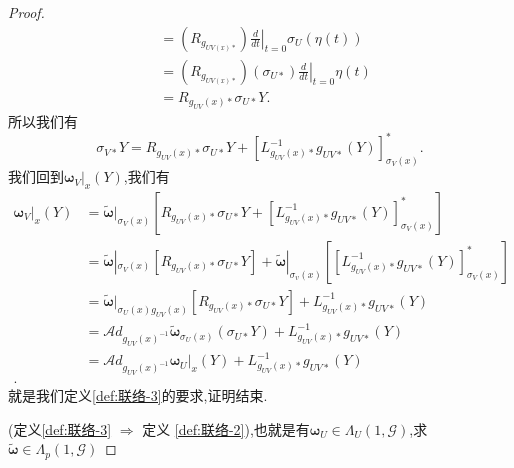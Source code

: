 \documentclass[../main.tex]{subfiles}
\begin{document}
\begin{proof}
\begin{align*}
                                                                & = (R_{g_{UV(x)*}})\left.\frac{d}{dt} \right|_{t = 0} \sigma_U(\eta(t))\\
                                                                & = (R_{g_{UV(x)*}})(\sigma_{U*})\left.\frac{d}{dt} \right|_{t = 0} \eta(t)\\
                                                                &= R_{g_{UV}(x)*}\sigma_{U*}Y
.\end{align*}
所以我们有
\begin{equation}
  \sigma_{V*}Y =  R_{g_{UV}(x)*}\sigma_{U*}Y + [L^{-1}_{g_{UV}(x)*}g_{UV*}(Y)]^*_{\sigma_V(x)}
  .\label{eq:I-2-6}
\end{equation}
我们回到$\bm{\omega}_V|_x(Y)$,我们有
\begin{align*}
  \bm{\omega}_V|_x(Y)& =\bm{\tilde{\omega}}|_{\sigma_V(x)}[R_{g_{UV}(x)*}\sigma_{U*}Y + [L^{-1}_{g_{UV}(x)*}g_{UV*}(Y)]^*_{\sigma_V(x)}]\\
                     & = \bm{\tilde{\omega}}|_{\sigma_V(x)}[R_{g_{UV}(x)*}\sigma_{U*}Y ]+\bm{\tilde{\omega}}|_{\sigma_v(x)}[[L^{-1}_{g_{UV}(x)*}g_{UV*}(Y)]^*_{\sigma_V(x)}]\\
                     & = \bm{\tilde{\omega}}|_{\sigma_U(x)g_{UV}(x)}[R_{g_{UV}(x)*}\sigma_{U*}Y ] +L^{-1}_{g_{UV}(x)*}g_{UV*}(Y)\\
                     & = \mathscr{A}\!d_{g_{UV}(x)^{-1}}\bm{\tilde{\omega}}_{\sigma_U(x)}(\sigma_{U*}Y)+ L^{-1}_{g_{UV}(x)*}g_{UV*}(Y)\\
                     & = \mathscr{A}\!d_{g_{UV}(x)^{-1}}\bm{\omega}_{U}|_x(Y)+ L^{-1}_{g_{UV}(x)*}g_{UV*}(Y)\\
.\end{align*}
就是我们定义\ref{def:联络-3}的要求,证明结束.

(定义\ref{def:联络-3} $\Rightarrow$ 定义 \ref{def:联络-2}),也就是有$\bm{\omega}_U \in \Lambda_U(1,\mathscr{G}) $,求$\bm{\tilde{\omega}} \in \Lambda_p(1,\mathscr{G})$ 


\end{proof}
\end{document}
